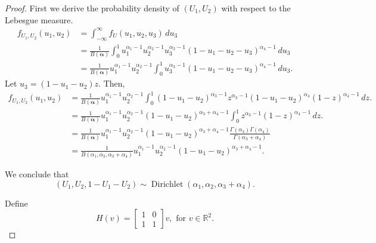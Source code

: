 \documentclass[a4paper, notitlepage, 11pt]{article}
\newcommand{\R}{\mathbb{R}}
\theoremstyle{definition}
\theoremstyle{remark}
\begin{document}
\begin{proof}
  First we derive the probability density of $(U_1, U_2)$ with respect to the
  Lebesgue measure. 
  \begin{equation}
    \label{eq:dist-u1-u2}
    \begin{split}
      f_{U_1, U_2}(u_1, u_2) &= \int_{-\infty}^{\infty} f_{U}(u_1,u_2,u_3) \, du_3 \\ 
      &= \frac{1}{B(\boldsymbol{\alpha})}\int_0^1 u_1^{\alpha_1-1}u_2^{\alpha_2-1}u_3^{\alpha_3-1}(1-u_1-u_2-u_3)^{\alpha_4-1} \, du_3 \\
      &= \frac{1}{B(\boldsymbol{\alpha})}u_1^{\alpha_1-1}u_2^{\alpha_2-1}\int_0^1 u_3^{\alpha_3-1}(1-u_1-u_2-u_3)^{\alpha_4-1} \, du_3.
    \end{split}
  \end{equation}
  Let $u_3 = (1 - u_1 - u_2)z$. Then,
  \begin{equation}
    \begin{split}
      f_{U_1, U_2}(u_1, u_2) &= \frac{1}{B(\boldsymbol{\alpha})}u_1^{\alpha_1-1}u_2^{\alpha_2-1}\int_0^1 (1-u_1-u_2)^{\alpha_3-1}z^{\alpha_3-1}(1-u_1-u_2)^{\alpha_4}(1-z)^{\alpha_4-1} \, dz. \\
      &= \frac{1}{B(\boldsymbol{\alpha})}u_1^{\alpha_1-1}u_2^{\alpha_2-1}(1-u_1-u_2)^{\alpha_3+\alpha_4-1}\int_0^1 z^{\alpha_3-1}(1-z)^{\alpha_4-1} \, dz. \\
      &= \frac{1}{B(\boldsymbol{\alpha})}u_1^{\alpha_1-1}u_2^{\alpha_2-1}(1-u_1-u_2)^{\alpha_3+\alpha_4-1}\frac{\Gamma(\alpha_3)\Gamma(\alpha_4)}{\Gamma(\alpha_3 + \alpha_4)} \\
      &= \frac{1}{B(\alpha_1, \alpha_2, \alpha_3+\alpha_4)}u_1^{\alpha_1-1}u_2^{\alpha_2-1}(1-u_1-u_2)^{\alpha_3+\alpha_4-1}.
    \end{split}
  \end{equation}

We conclude that
$$(U_1, U_2, 1-U_1-U_2) \sim
\operatorname{Dirichlet}(\alpha_1,\alpha_2,\alpha_3+\alpha_4).$$

Define 
$$
H(v) = \begin{bmatrix}
  1 & 0 \\ 1 & 1
\end{bmatrix}v, \text{ for } v \in \R^2.
$$


\end{proof}
\end{document}
